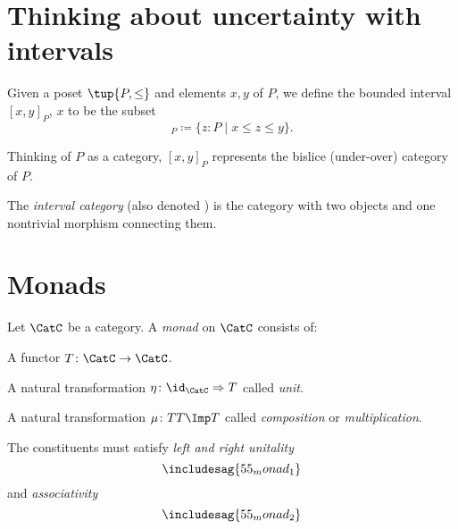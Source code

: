 \section{Thinking about uncertainty with intervals}

\begin{definition}
Given a poset $ \tup{P, \leq}$ and elements $x,y$ of $P$, we define the bounded interval $[x,y]_P$, $x$ to be the subset
\begin{equation}
    [x,y]_P\coloneqq \{z\colon P \mid x\leq z \leq y\}.
\end{equation}

\end{definition}



Thinking of $P$ as a category, $[x,y]_P$ represents the bislice (under-over) category of $P$.


\begin{definition}
The \emph{interval category} (also denoted ) is the category with two objects and one nontrivial morphism connecting them.
\end{definition}


\section{Monads}

\begin{shaded}
\begin{definition}[Monad]
Let $\CatC$ be a category. A \emph{monad} on $\CatC$ consists of:
\begin{compactenum}
    \item A functor $T \colon \CatC \to \CatC$.
    \item A natural transformation $\eta \colon \id_\CatC \Rightarrow T$ called \emph{unit}.
    \item A natural transformation $\mu\colon TT\Imp T$ called \emph{composition} or \emph{multiplication}.
\end{compactenum}
The constituents must satisfy \emph{left and right unitality}
\begin{equation}
\includesag{55_monad_1}
\end{equation}
and \emph{associativity}
\begin{equation}
\includesag{55_monad_2}
\end{equation}
\end{definition}
\end{shaded}


